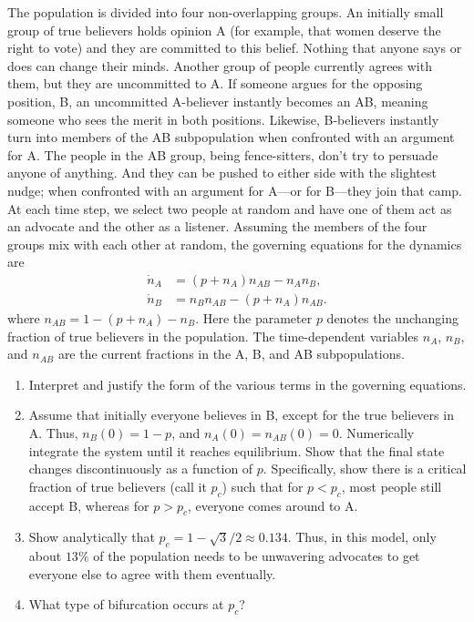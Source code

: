 \documentclass[10pt]{amsart}
\begin{document}
\begin{onehalfspace}
        The population is divided into four non-overlapping groups. An initially small group of true believers holds opinion A (for example, that women deserve the right to vote) and they are committed to this belief. Nothing that anyone says or does can change their minds. Another group of people currently agrees with them, but they are uncommitted to A. If someone argues for the opposing position, B, an uncommitted A-believer instantly becomes an AB, meaning someone who sees the merit in both positions. Likewise, B-believers instantly turn into members of the AB subpopulation when confronted with an argument for A. The people in the AB group, being fence-sitters, don't try to persuade anyone of anything. And they can be pushed to either side with the slightest nudge; when confronted with an argument for A---or for B---they join that camp. At each time step, we select two people at random and have one of them act as an advocate and the other as a listener. Assuming the members of the four groups mix with each other at random, the governing equations for the dynamics are
        \[
        \begin{aligned}
            \dot{n}_A &= (p+n_A)n_{AB}-n_A n_B,\\
            \dot{n}_B &= n_B n_{AB}-(p+n_A)n_{AB}.
        \end{aligned}
        \]
        where $n_{AB}=1-(p+n_A)-n_B$. Here the parameter $p$ denotes the unchanging fraction of true believers in the population. The time-dependent variables $n_A$, $n_B$, and $n_{AB}$ are the current fractions in the A, B, and AB subpopulations.
        \begin{enumerate}[label=\alph*)]
            \item Interpret and justify the form of the various terms in the governing equations.
            \item Assume that initially everyone believes in B, except for the true believers in A. Thus, $n_B(0)=1-p$, and $n_A(0)=n_{AB}(0)=0$. Numerically integrate the system until it reaches equilibrium. Show that the final state changes discontinuously as a function of $p$. Specifically, show there is a critical fraction of true believers (call it $p_c$) such that for $p<p_c$, most people still accept B, whereas for $p>p_c$, everyone comes around to A.
            \item Show analytically that $p_c=1-\sqrt{3}/2\approx 0.134$. Thus, in this model, only about $13\%$ of the population needs to be unwavering advocates to get everyone else to agree with them eventually.
            \item What type of bifurcation occurs at $p_c$?
        \end{enumerate}


\end{onehalfspace}
\end{document}
